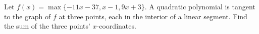 Let $f(x)=\max\{-11x-37,x-1,9x+3\}$. A quadratic polynomial is tangent to the graph of $f$ at three points, each in the interior of a linear segment. Find the sum of the three points' $x$-coordinates.
